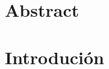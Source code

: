 \documentclass{article}
\begin{document}
    

    \tableofcontents
    \listoffigures
    \listoftables
    \newpage

    \section*{Abstract}
        
    
    \section{Introdución}
        
\end{document}
